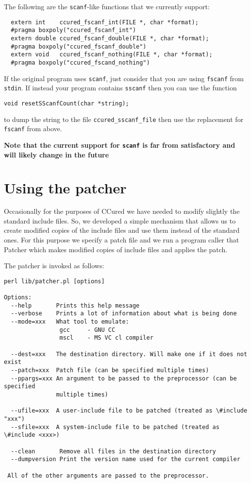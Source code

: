 \documentclass{book}
\def\t#1{{\tt #1}}
\begin{document}
 The following are the \t{scanf}-like functions that we currently support:
\begin{verbatim}
  extern int    ccured_fscanf_int(FILE *, char *format);
  #pragma boxpoly("ccured_fscanf_int")
  extern double ccured_fscanf_double(FILE *, char *format);
  #pragma boxpoly("ccured_fscanf_double")
  extern void   ccured_fscanf_nothing(FILE *, char *format);
  #pragma boxpoly("ccured_fscand_nothing")
\end{verbatim}

 If the original program uses \t{scanf}, just consider that you are using
\t{fscanf} from \t{stdin}. If instead your program contains \t{sscanf} then
you can use the function 
\begin{verbatim}
void resetSScanfCount(char *string);
\end{verbatim}

 to dump the string to the file \t{ccured\_sscanf\_file} then use the
replacement for \t{fscanf} from above. 

 {\bf Note that the current support for \t{scanf} is far from satisfactory and
 will likely change in the future}


    \chapter{Using the patcher}

 Occasionally for the purposes of CCured we have needed to modify slightly the
standard include files. So, we developed a simple mechanism that allows us to
create modified copies of the include files and use them instead of the
standard ones. For this purpose we specify a patch file and we run a program
caller that Patcher which makes modified copies of include files and applies
the patch. 

 The patcher is invoked as follows: 
\begin{verbatim}
perl lib/patcher.pl [options]

Options:
  --help       Prints this help message
  --verbose    Prints a lot of information about what is being done
  --mode=xxx   What tool to emulate: 
                gcc     - GNU CC
                mscl    - MS VC cl compiler

  --dest=xxx   The destination directory. Will make one if it does not exist
  --patch=xxx  Patch file (can be specified multiple times)
  --ppargs=xxx An argument to be passed to the preprocessor (can be specified
               multiple times)

  --ufile=xxx  A user-include file to be patched (treated as \#include "xxx")
  --sfile=xxx  A system-include file to be patched (treated as \#include <xxx>)
 
  --clean       Remove all files in the destination directory
  --dumpversion Print the version name used for the current compiler

 All of the other arguments are passed to the preprocessor.
\end{verbatim}
\end{document}

